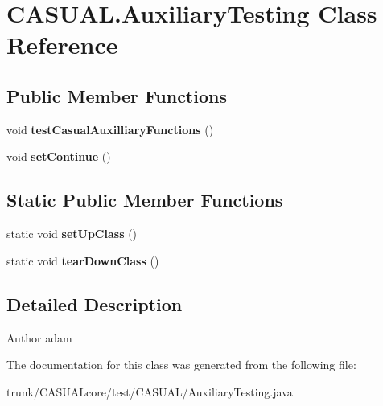 \hypertarget{class_c_a_s_u_a_l_1_1_auxiliary_testing}{\section{C\-A\-S\-U\-A\-L.\-Auxiliary\-Testing Class Reference}
\label{class_c_a_s_u_a_l_1_1_auxiliary_testing}
}
\subsection*{Public Member Functions}
\begin{DoxyCompactItemize}
\item 
\hypertarget{class_c_a_s_u_a_l_1_1_auxiliary_testing_aa535a477442efe3ddd18eea28439a8bf}{void {\bfseries test\-Casual\-Auxilliary\-Functions} ()}\label{class_c_a_s_u_a_l_1_1_auxiliary_testing_aa535a477442efe3ddd18eea28439a8bf}

\item 
\hypertarget{class_c_a_s_u_a_l_1_1_auxiliary_testing_a605043673fdc0356bc8577ab357c6b7d}{void {\bfseries set\-Continue} ()}\label{class_c_a_s_u_a_l_1_1_auxiliary_testing_a605043673fdc0356bc8577ab357c6b7d}

\end{DoxyCompactItemize}
\subsection*{Static Public Member Functions}
\begin{DoxyCompactItemize}
\item 
\hypertarget{class_c_a_s_u_a_l_1_1_auxiliary_testing_a8fcb3ba38867241545133c5ebb58dcea}{static void {\bfseries set\-Up\-Class} ()}\label{class_c_a_s_u_a_l_1_1_auxiliary_testing_a8fcb3ba38867241545133c5ebb58dcea}

\item 
\hypertarget{class_c_a_s_u_a_l_1_1_auxiliary_testing_a953144b3ee9e57b372e6d7f04d3f807d}{static void {\bfseries tear\-Down\-Class} ()}\label{class_c_a_s_u_a_l_1_1_auxiliary_testing_a953144b3ee9e57b372e6d7f04d3f807d}

\end{DoxyCompactItemize}


\subsection{Detailed Description}
\begin{DoxyAuthor}{Author}
adam 
\end{DoxyAuthor}


The documentation for this class was generated from the following file\-:\begin{DoxyCompactItemize}
\item 
trunk/\-C\-A\-S\-U\-A\-Lcore/test/\-C\-A\-S\-U\-A\-L/Auxiliary\-Testing.\-java\end{DoxyCompactItemize}
